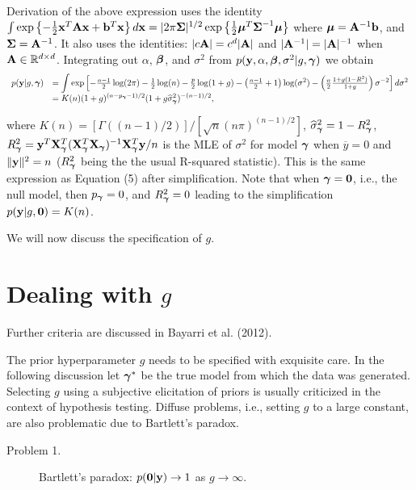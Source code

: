 \documentclass{article}[12pt]
\def\R{{\mathbb R}}
\newcommand{\joc}[1]{{\color{red}#1}}
\begin{document}
\noindent 
	Derivation of the above expression uses the identity
	$
	\int \exp\left\{ -\tfrac{1}{2}{\bf x}^T{\bf A}{\bf x} + {\bf b}^T{\bf x} \right\} d {\bf x} = |2\pi{\boldsymbol\Sigma}|^{1/2} \exp\left\{ \tfrac{1}{2}{\boldsymbol \mu}^T{\boldsymbol \Sigma}^{-1}{\boldsymbol \mu} \right\}
	$
	where ${\boldsymbol \mu} = {\bf A}^{-1}{\bf b}$, and ${\boldsymbol \Sigma} = {\bf A}^{-1}$.
	It also uses the identities: $|c{\bf A}| = c^d|{\bf A}|$ and $|{\bf A}^{-1}| = |{\bf A}|^{-1}$ when $\mA \in\R^{d\times d}$.
Integrating out $\alpha$, ${\boldsymbol \beta}$, and $\sigma^2$ from $p({\bf y},\alpha,{\boldsymbol \beta},\sigma^2|g,{\boldsymbol \gamma})$ we
obtain
\begin{equation}\label{eq:yGivenG}
\begin{array}{rl}
\displaystyle p({\bf y}|g,{\boldsymbol \gamma})
& \displaystyle = \int \exp\left[
- \tfrac{n-1}{2}\log(2\pi) 
- \tfrac{1}{2}\log(n)
- \tfrac{p}{2}\log(1 + g)
- \left( \tfrac{n-1}{2} + 1\right)\log(\sigma^2) 
- \left( \tfrac{n}{2} \tfrac{1 + g(1-R^2)}{1 + g} \right)\sigma^{-2} 
\right]  d\sigma^2
\\
& 
\displaystyle = K(n)
(1 + g)^{(n - p_{\boldsymbol \gamma} - 1)/2}(1 + g \widehat{\sigma}_{\boldsymbol \gamma}^2)^{-(n-1)/2},
\end{array} 
\end{equation}

\noindent where $K(n) = [\Gamma( (n-1)/2 )]/[\sqrt{n}(n\pi)^{(n-1)/2}]$, 
$\widehat{\sigma}_{\boldsymbol \gamma}^2 = 1 - R_{\boldsymbol \gamma}^2$, 
$R_{\boldsymbol \gamma}^2 = {\bf y}^T{\bf X}_{\boldsymbol \gamma}^T({\bf X}_{\boldsymbol \gamma}^T{\bf X}_{\boldsymbol \gamma})^{-1}{\bf X}_{\boldsymbol \gamma}^T{\bf y}/n$ is the MLE of $\sigma^2$ for model
${\boldsymbol \gamma}$ when $\overline{y}=0$ and $\|{\bf y}\|^2 = n$
($R_{\boldsymbol \gamma}^2$
being the the usual R-squared statistic).
This is the same expression as \cite{Liang2008} Equation (5) 
after simplification. Note that
when ${\boldsymbol \gamma} = {\bf 0}$, i.e., the null model, then $p_{\boldsymbol \gamma} = 0$, and
$R_{\boldsymbol \gamma}^2 = 0$ leading to the simplification $p({\bf y}|g,{\bf 0}) = K(n)$. 

We will now discuss the specification of $g$.




\section{Dealing with $g$}
\label{sec:MarginalLikelihood}
Further criteria are discussed in  Bayarri et al. (2012).

The prior hyperparameter $g$ needs to be specified with exquisite care. 
In the following discussion let ${\boldsymbol \gamma}^*$ be the true model from which the data was generated. 
Selecting $g$ using a subjective elicitation of priors is usually criticized in the context of 
hypothesis testing. Diffuse problems, i.e., setting $g$ to a large constant, are also problematic 
due to Bartlett's paradox. 
\begin{description}
	\item[Problem 1.] Bartlett's paradox: $p({\bf 0}|{\bf y}) \to 1$ as $g\to\infty$.
\end{description}
\end{document}
